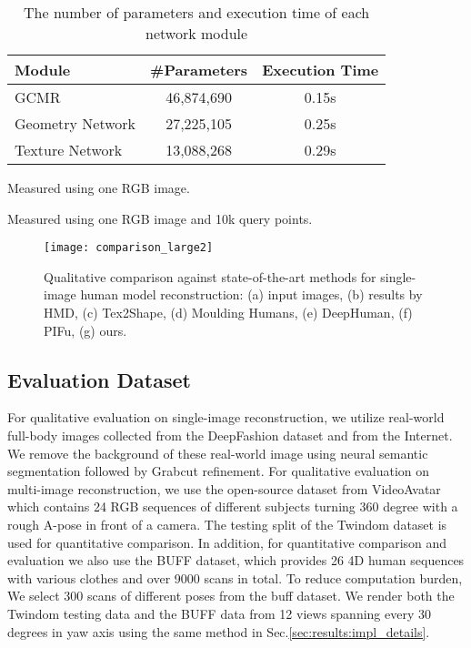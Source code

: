 \begin{table}
    \centering
    \caption{The number of parameters and execution time of each network module}
    \label{tab:complexity}
	\begin{threeparttable}
    \begin{tabular}{lcc}
        \toprule
         Module & \#Parameters & Execution Time  \\
         \midrule
         GCMR  & 46,874,690 & 0.15s\tnote{} \\
         Geometry Network  & 27,225,105 & 0.25s\tnote{}\\ 
         Texture Network & 13,088,268 & 0.29s\tnote{}\\
         \bottomrule
    \end{tabular}
	\begin{tablenotes}
        \scriptsize
        \item[] Measured using one RGB image. 
        \item[] Measured using one RGB image and 10k query points. 
        \end{tablenotes}
        \end{threeparttable}
 \end{table}





\begin{figure*}
  \centering
  \texttt{[image: comparison\_large2]}
  \caption{Qualitative comparison against state-of-the-art methods for single-image human model reconstruction: (a) input images,  (b) results by HMD\cite{HMD2019}, (c) Tex2Shape\cite{tex2shape2019}, (d) Moulding Humans\cite{MouldingHumans2019}, (e) DeepHuman\cite{Zheng2019DeepHuman}, (f) PIFu\cite{pifuSHNMKL19}, (g) ours. }
  \label{fig:comparison} \end{figure*}

\subsection{Evaluation Dataset}
\label{sec:results:dataset}
For qualitative evaluation on single-image reconstruction, we utilize real-world full-body images collected from the DeepFashion dataset\cite{liuLQWTcvpr16DeepFashion} and from the Internet. We remove the background of these real-world image using neural semantic segmentation\cite{liang2018LIP} followed by Grabcut refinement\cite{rother2004grabcut}. For qualitative evaluation on multi-image reconstruction, we use the open-source dataset from VideoAvatar\cite{VideoAvater} which contains 24 RGB sequences of different subjects turning 360 degree with a rough A-pose in front of a camera. The testing split of the Twindom dataset is used for quantitative comparison. In addition, for quantitative comparison and evaluation we also use the BUFF dataset\cite{shapeundercloth:CVPR17}, which provides 26 4D human sequences with various clothes and over 9000 scans in total. To reduce computation burden, We select 300 scans of different poses from the buff dataset. We render both the Twindom testing data and the BUFF data from 12 views spanning every 30 degrees in yaw axis using the same method in Sec.\ref{sec:results:impl_details}. 




